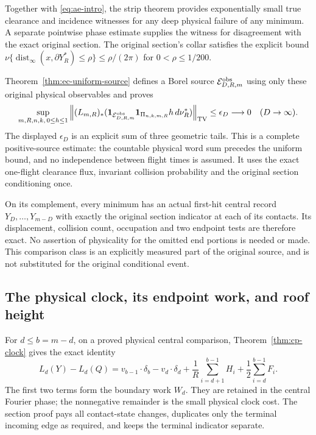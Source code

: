 \documentclass[11pt,reqno]{amsart}
\numberwithin{equation}{section}
\theoremstyle{definition}\newtheorem{definition}[theorem]{Definition}
\theoremstyle{remark}\newtheorem{remark}[theorem]{Remark}
\newcommand{\one}{\mathbf1}\newcommand{\dd}{\,\mathrm d}
\begin{document}
Together with \eqref{eq:ae-intro}, the strip theorem provides
exponentially small true clearance and incidence witnesses for any
deep physical failure of any minimum.  A separate pointwise phase
estimate supplies the witness for disagreement with the exact
original section.  The original section's collar satisfies the
explicit bound $\nu\{\operatorname{dist}_\infty
 (x,\partial Y_R^*)\le\rho\}\le\rho/(2\pi)$ for
$0<\rho\le1/200$.

Theorem~\ref{thm:ec-uniform-source} defines a Borel source
$\mathcal E^{\rm obs}_{D,R,m}$ using only these original physical
observables and proves
\[
 \sup_{m,R,n,k,\,0\le h\le1}
 \left\|(L_{m,R})_*
  (\one_{\mathcal E^{\rm obs}_{D,R,m}}\one_{\Pi_{n,k,m,R}}
                                  h\,d\nu_R^*)\right\|_{\rm TV}
 \le\epsilon_D\longrightarrow0\quad(D\to\infty).
\]
The displayed $\epsilon_D$ is an explicit sum of three geometric
tails.  This is a complete positive-source estimate: the countable
physical word sum precedes the uniform bound, and no independence
between flight times is assumed.  It uses the exact one-flight
clearance flux, invariant collision probability and the original
section conditioning once.

On its complement, every minimum has an actual first-hit central
record $Y_D,\ldots,Y_{m-D}$ with exactly the original section
indicator at each of its contacts.  Its displacement, collision
count, occupation and two endpoint tests are therefore exact.
No assertion of physicality for the omitted end portions is needed
or made.  This comparison class is an explicitly measured part of
the original source, and is not substituted for the original
conditional event.

\subsection*{The physical clock, its endpoint work, and roof height}
For $d\le b=m-d$, on a proved physical central comparison,
Theorem~\ref{thm:cp-clock} gives the exact identity
\[
 L_d(Y)-L_d(Q)
   =v_{b-1}\cdot\delta_b-v_d\cdot\delta_d
     +\frac1R\sum_{i=d+1}^{b-1}H_i
                    +\frac12\sum_{i=d}^{b-1}F_i .
\]
The first two terms form the boundary work $W_d$.  They are
retained in the central Fourier phase; the nonnegative remainder
is the small physical clock cost.  The section proof pays all
contact-state changes, duplicates only the terminal incoming edge
as required, and keeps the terminal indicator separate.
\end{document}

